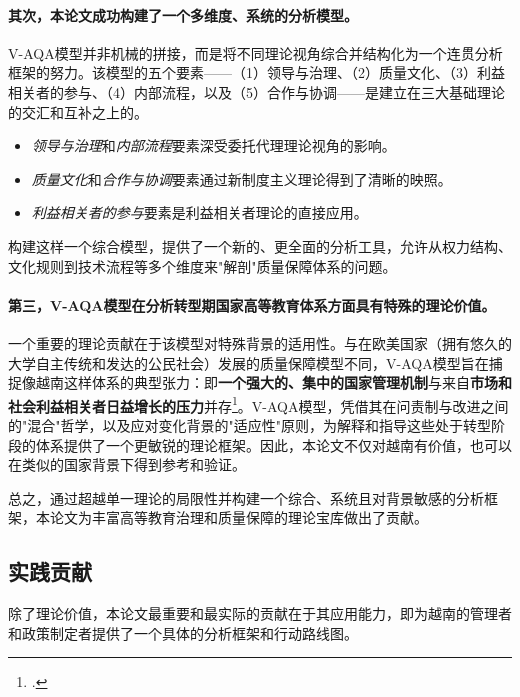 \paragraph{其次，本论文成功构建了一个多维度、系统的分析模型。}
V-AQA模型并非机械的拼接，而是将不同理论视角综合并结构化为一个连贯分析框架的努力。该模型的五个要素——（1）领导与治理、（2）质量文化、（3）利益相关者的参与、（4）内部流程，以及（5）合作与协调——是建立在三大基础理论的交汇和互补之上的。
\begin{itemize}
    \item \textit{领导与治理}和\textit{内部流程}要素深受委托代理理论视角的影响。
    \item \textit{质量文化}和\textit{合作与协调}要素通过新制度主义理论得到了清晰的映照。
    \item \textit{利益相关者的参与}要素是利益相关者理论的直接应用。
\end{itemize}
构建这样一个综合模型，提供了一个新的、更全面的分析工具，允许从权力结构、文化规则到技术流程等多个维度来"解剖"质量保障体系的问题。

\paragraph{第三，V-AQA模型在分析转型期国家高等教育体系方面具有特殊的理论价值。}
一个重要的理论贡献在于该模型对特殊背景的适用性。与在欧美国家（拥有悠久的大学自主传统和发达的公民社会）发展的质量保障模型不同，V-AQA模型旨在捕捉像越南这样体系的典型张力：即\textbf{一个强大的、集中的国家管理机制}与来自\textbf{市场和社会利益相关者日益增长的压力}并存\footcite{WB_TransitionalQA}。V-AQA模型，凭借其在问责制与改进之间的"混合"哲学，以及应对变化背景的"适应性"原则，为解释和指导这些处于转型阶段的体系提供了一个更敏锐的理论框架。因此，本论文不仅对越南有价值，也可以在类似的国家背景下得到参考和验证。

总之，通过超越单一理论的局限性并构建一个综合、系统且对背景敏感的分析框架，本论文为丰富高等教育治理和质量保障的理论宝库做出了贡献。

\subsection{实践贡献}
\label{subsec:dong_gop_thuc_tien}

除了理论价值，本论文最重要和最实际的贡献在于其应用能力，即为越南的管理者和政策制定者提供了一个具体的分析框架和行动路线图。

